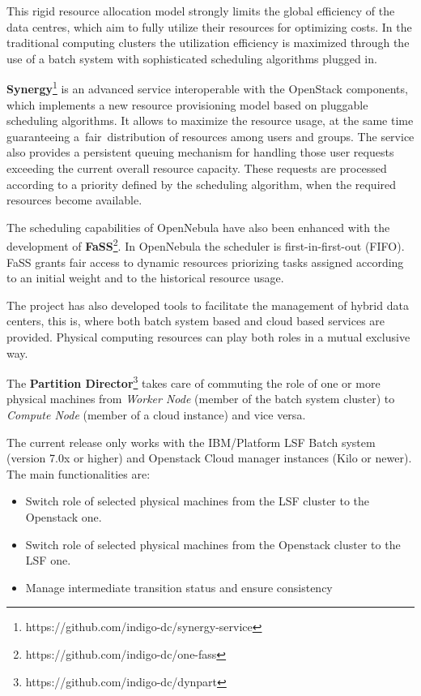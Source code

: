 \documentclass{article}
\begin{document}
This rigid resource allocation model strongly limits the global efficiency of the data centres, which aim to fully utilize their resources for optimizing costs. In the traditional computing clusters the utilization efficiency is maximized through the use of a batch system with sophisticated scheduling algorithms plugged in.

{\bf Synergy}\footnote{https://github.com/indigo-dc/synergy-service} is an advanced service interoperable with the OpenStack components, which implements a new resource provisioning model based on pluggable scheduling algorithms. It allows to maximize the resource usage, at the same time guaranteeing a fair distribution of resources among users and groups. The service also provides a persistent queuing mechanism for handling those user requests exceeding the current overall resource capacity. These requests are processed according to a priority defined by the scheduling algorithm, when the required resources become available.

The scheduling capabilities of OpenNebula have also been enhanced with the development of {\bf FaSS}\footnote{https://github.com/indigo-dc/one-fass}. In OpenNebula the scheduler is first-in-first-out (FIFO). FaSS grants fair access to dynamic resources priorizing tasks assigned according to an initial weight and to the historical resource usage.

The project has also developed tools to facilitate the management of hybrid data centers, this is, where both batch system based and cloud based services are 
provided. Physical computing resources can play both roles in a mutual exclusive way.

The {\bf Partition Director}\footnote{https://github.com/indigo-dc/dynpart} takes care of commuting the role of one or more physical machines from {\sl Worker Node} (member of the batch system cluster) to {\sl Compute Node} (member of a cloud instance) and vice versa.

The current release only works with the IBM/Platform LSF Batch system (version 7.0x or higher) and Openstack Cloud manager instances (Kilo or newer).
The main functionalities are:

\begin{itemize}
\item Switch role of selected physical machines from the LSF cluster to the Openstack one.
\item Switch role of selected physical machines from the Openstack cluster to the LSF one.
\item Manage intermediate transition status and ensure consistency
\end{itemize}
\end{document}
